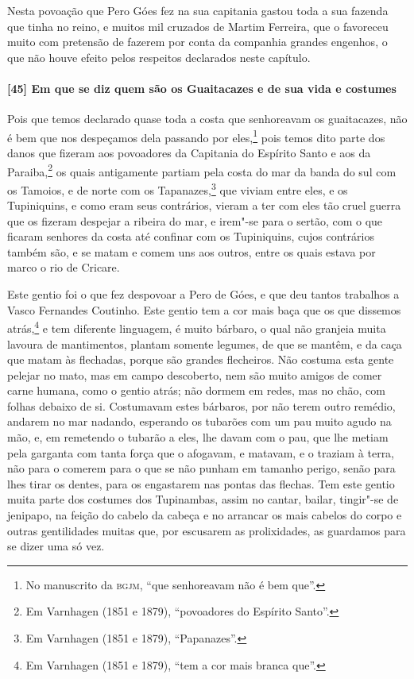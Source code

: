 Nesta povoação que Pero Góes fez na sua capitania gastou toda a sua fazenda que tinha no
reino, e muitos mil cruzados de Martim Ferreira, que o favoreceu muito com pretensão de
fazerem por conta da companhia grandes engenhos, o que não houve efeito pelos respeitos
declarados neste capítulo.

\paragraph{[45] Em que se diz quem são os Guaitacazes e de sua vida e costumes} \quad
Pois que temos declarado quase toda a costa que senhoreavam os guaitacazes, não é bem que
nos despeçamos dela passando por eles,\footnote{ No manuscrito da \textsc{bgjm}, ``que
senhoreavam não é bem que''.} pois temos dito parte dos danos que fizeram aos povoadores
da Capitania do Espírito Santo e aos da Paraiba,\footnote{ Em Varnhagen (1851 e 1879),
``povoadores do Espírito Santo''.} os quais antigamente partiam pela costa do mar da banda
do sul com os Tamoios, e de norte com os Tapanazes,\footnote{ Em Varnhagen (1851 e 1879),
``Papanazes''.} que viviam entre eles, e os Tupiniquins, e como eram seus contrários,
vieram a ter com eles tão cruel guerra que os fizeram despejar a ribeira do mar, e irem"-se
para o sertão, com o que ficaram senhores da costa até confinar com os Tupiniquins, cujos
contrários também são, e se matam e comem uns aos outros, entre os quais estava por marco
o rio de Cricare.

Este gentio foi o que fez despovoar a Pero de Góes, e que deu tantos trabalhos a Vasco
Fernandes Coutinho. Este gentio tem a cor mais baça que os que dissemos atrás,\footnote{
Em Varnhagen (1851 e 1879), ``tem a cor mais branca que''.} e tem diferente linguagem, é
muito bárbaro, o qual não granjeia muita lavoura de mantimentos, plantam somente legumes,
de que se mantêm, e da caça que matam às flechadas, porque são grandes flecheiros. Não
costuma esta gente pelejar no mato, mas em campo descoberto, nem são muito amigos de comer
carne humana, como o gentio atrás; não dormem em redes, mas no chão, com folhas debaixo de
si. Costumavam estes bárbaros, por não terem outro remédio, andarem no mar nadando,
esperando os tubarões com um pau muito agudo na mão, e, em remetendo o tubarão a eles, lhe
davam com o pau, que lhe metiam pela garganta com tanta força que o afogavam, e matavam, e
o traziam à terra, não para o comerem para o que se não punham em tamanho perigo, senão
para lhes tirar os dentes, para os engastarem nas pontas das flechas. Tem este gentio
muita parte dos costumes dos Tupinambas, assim no cantar, bailar, tingir"-se de jenipapo,
na feição do cabelo da cabeça e no arrancar os mais cabelos do corpo e outras gentilidades
muitas que, por escusarem as prolixidades, as guardamos para se dizer uma só vez.

